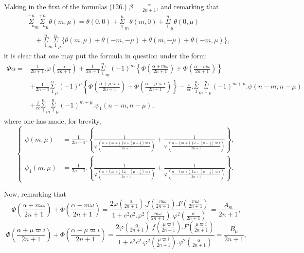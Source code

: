 \documentclass{article}
\begin{document}
Making in the first of the formulas (126.) $\beta=\frac{\alpha}{2n+1}$, and remarking that
\[ \begin{aligned}
&\overset{+n}{\underset{-n}{\Sigma}}_{m}\overset{+n}{\underset{-n}{\Sigma}}_{\mu}\theta(m,\mu)=\theta(0,0)+\overset{n}{\underset{1}{\Sigma}}_{m}\theta(m,0)+\overset{n}{\underset{1}{\Sigma}}_{\mu}\theta(0,\mu)\\
&\quad+\overset{n}{\underset{1}{\Sigma}}_{m}\overset{n}{\underset{1}{\Sigma}}_{\mu}\{\theta(m,\mu)+\theta(-m,-\mu)+\theta(m,-\mu)+\theta(-m,\mu)\},
\end{aligned} \tag{131.} \]
it is clear that one may put the formula in question under the form:
\[ \begin{aligned}
\Phi\alpha={}&\frac{1}{2n+1}.\varphi\left(\frac{\alpha}{2n+1}\right)+\frac{1}{2n+1}\overset{n}{\underset{1}{\Sigma}}_{m}(-1)^{m}\left\{\Phi\left(\frac{\alpha+m\omega}{2n+1}\right)+\Phi\left(\frac{\alpha-m\omega}{2n+1}\right)\right\}\\
&+\frac{1}{2n+1}\overset{n}{\underset{1}{\Sigma}}_{\mu}(-1)^{\mu}\left\{\Phi\left(\frac{\alpha+\mu\varpi i}{2n+1}\right)+\Phi\left(\frac{\alpha-\mu\varpi i}{2n+1}\right)\right\}-\frac{i}{ec}.\overset{n}{\underset{1}{\Sigma}}_{m}\overset{n}{\underset{1}{\Sigma}}_{\mu}(-1)^{m+\mu}.\psi(n-m,n-\mu)\\
&+\frac{i}{ec}\overset{n}{\underset{1}{\Sigma}}_{m}\overset{n}{\underset{1}{\Sigma}}_{\mu}(-1)^{m+\mu}.\psi_{1}(n-m,n-\mu),
\end{aligned} \tag{132.} \]
where one has made, for brevity,
\[ \left\{\begin{aligned}
\psi(m,\mu)&=\frac{1}{2n+1}.\left\{\frac{1}{\varphi\left(\frac{\alpha+(m+\tfrac{1}{2})\omega+(\mu+\tfrac{1}{2})\varpi i}{2n+1}\right)}+\frac{1}{\varphi\left(\frac{\alpha-(m+\tfrac{1}{2})\omega-(\mu+\tfrac{1}{2})\varpi i}{2n+1}\right)}\right\},\\
\psi_{1}(m,\mu)&=\frac{1}{2n+1}.\left\{\frac{1}{\varphi\left(\frac{\alpha+(m+\tfrac{1}{2})\omega-(\mu+\tfrac{1}{2})\varpi i}{2n+1}\right)}+\frac{1}{\varphi\left(\frac{\alpha-(m+\tfrac{1}{2})\omega+(\mu+\tfrac{1}{2})\varpi i}{2n+1}\right)}\right\}.
\end{aligned}\right. \tag{133.} \]

Now, remarking that
\[ \Phi\left(\frac{\alpha+m\omega}{2n+1}\right)+\Phi\left(\frac{\alpha-m\omega}{2n+1}\right)=\frac{2\varphi\left(\frac{\alpha}{2n+1}\right).f\left(\frac{m\omega}{2n+1}\right).F\left(\frac{m\omega}{2n+1}\right)}{1+e^{2}c^{2}.\varphi^{2}\left(\frac{m\omega}{2n+1}\right).\varphi^{2}\left(\frac{\alpha}{2n+1}\right)}=\frac{A_{m}}{2n+1}, \]
\[ \Phi\left(\frac{\alpha+\mu\varpi i}{2n+1}\right)+\Phi\left(\frac{\alpha-\mu\varpi i}{2n+1}\right)=\frac{2\varphi\left(\frac{\alpha}{2n+1}\right).f\left(\frac{\mu\varpi i}{2n+1}\right).F\left(\frac{\mu\varpi i}{2n+1}\right)}{1+e^{2}c^{2}.\varphi^{2}\left(\frac{\mu\varpi i}{2n+1}\right).\varphi^{2}\left(\frac{\alpha}{2n+1}\right)}=\frac{B_{\mu}}{2n+1}, \]
\end{document}
